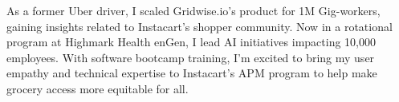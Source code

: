 
{

    As a former Uber driver, I scaled Gridwise.io’s product for 1M Gig-workers, gaining insights related to Instacart’s shopper community. Now in a rotational program at Highmark Health enGen, I lead AI initiatives impacting 10,000 employees. With software bootcamp training, I’m excited to bring my user empathy and technical expertise to Instacart’s APM program to help make grocery access more equitable for all.
}